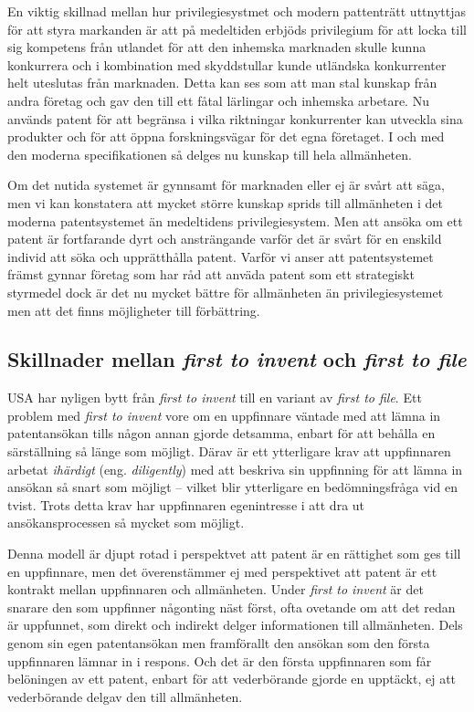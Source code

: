 En viktig skillnad mellan hur privilegiesystmet och modern pattenträtt uttnyttjas för att styra markanden är att på medeltiden erbjöds privilegium för att locka till sig kompetens från utlandet för att den inhemska marknaden skulle kunna konkurrera och i kombination med skyddstullar kunde utländska konkurrenter helt uteslutas från marknaden. Detta kan ses som att man stal kunskap från andra företag och gav den till ett fåtal lärlingar och inhemska arbetare. Nu används patent för att begränsa i vilka riktningar konkurrenter kan utveckla sina produkter och för att öppna forskningsvägar för det egna företaget. I och med den moderna specifikationen så delges nu kunskap till hela allmänheten. 

Om det nutida systemet är gynnsamt för marknaden eller ej är svårt att säga, men vi kan konstatera att mycket större kunskap sprids till allmänheten i det moderna patentsystemet än medeltidens privilegiesystem. Men att ansöka om ett patent är fortfarande dyrt och ansträngande varför det är svårt för en enskild individ att söka och upprätthålla patent. Varför vi anser att patentsystemet främst gynnar företag som har råd att anväda patent som ett strategiskt styrmedel dock är det nu mycket bättre för allmänheten än privilegiesystemet men att det finns möjligheter till förbättring.

\subsection{Skillnader mellan \emph{first to invent} och \emph{first to file}}

USA har nyligen bytt från \emph{first to invent} till en variant av \emph{first to file}. Ett problem med \emph{first to invent} vore om en uppfinnare väntade med att lämna in patentansökan tills någon annan gjorde detsamma, enbart för att behålla en särställning så länge som möjligt. Därav är ett ytterligare krav att uppfinnaren arbetat \emph{ihärdigt} (eng. \emph{diligently}) med att beskriva sin uppfinning för att lämna in ansökan så snart som möjligt\cite{cmu-overview} -- vilket blir ytterligare en bedömningsfråga vid en tvist\cite{cmu-overview}. Trots detta krav har uppfinnaren egenintresse i att dra ut ansökansprocessen så mycket som möjligt.

Denna modell är djupt rotad i perspektvet att patent är en rättighet som ges till en uppfinnare, men det överenstämmer ej med perspektivet att patent är ett kontrakt mellan uppfinnaren och allmänheten. Under \emph{first to invent} är det snarare den som uppfinner någonting näst först, ofta ovetande om att det redan är uppfunnet, som direkt och indirekt delger informationen till allmänheten. Dels genom sin egen patentansökan men framförallt den ansökan som den första uppfinnaren lämnar in i respons. Och det är den första uppfinnaren som får belöningen av ett patent, enbart för att vederbörande gjorde en upptäckt, ej att vederbörande delgav den till allmänheten.

